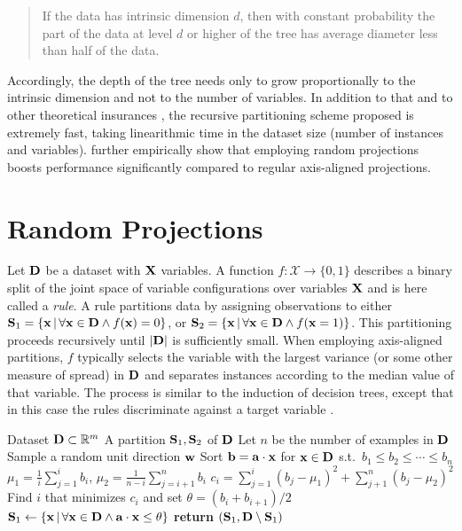\begin{quote}
  If the data has intrinsic dimension $d$, then with constant probability the part of the data at
  level $d$ or higher of the tree has average diameter less than half of the data.
\end{quote}

Accordingly, the depth of the tree needs only to grow proportionally to the intrinsic dimension and
not to the number of variables. In addition to that and to other theoretical insurances
\citep{dhesi10}, the recursive partitioning scheme proposed is extremely fast, taking linearithmic
time in the dataset size (number of instances and variables). \citet{dasgupta08a} further
empirically show that employing random projections boosts performance significantly compared to
regular axis-aligned projections.

\section{Random Projections}
\label{sec:rp}

Let $\mathbf{D}$ be a dataset with $\mathbf{X}$ variables. A function $f:\mathcal{X}\to\{0,1\}$ describes
a binary split of the joint space of variable configurations over variables $\mathbf{X}$ and is here
called a \emph{rule}. A rule partitions data by assigning observations to either
$\mathbf{S}_1=\{\mathbf{x}\,|\,\forall\mathbf{x}\in\mathbf{D}\wedge f(\mathbf{x})=0\}$, or
$\mathbf{S}_2=\{\mathbf{x}\,|\,\forall\mathbf{x}\in\mathbf{D}\wedge f(\mathbf{x}=1)\}$. This partitioning proceeds
recursively until $|\mathbf{D}|$ is sufficiently small. When employing axis-aligned partitions, $f$
typically selects the variable with the largest variance (or some other measure of spread) in
$\mathbf{D}$ and separates instances according to the median value of that variable. The process is
similar to the induction of decision trees, except that in this case the rules discriminate against
a target variable \citep{breiman01}.

\begin{algorithm}[t]
  \caption{}\label{alg:splitsid}
  \begin{algorithmic}[1]
    \Require Dataset $\mathbf{D}\subset\mathbb{R}^m$
    \Ensure A partition $\mathbf{S}_1,\mathbf{S}_2$ of $\mathbf{D}$
    \State Let $n$ be the number of examples in $\mathbf{D}$
    \State Sample a random unit direction $\mathbf{w}$
    \State Sort $\mathbf{b}=\mathbf{a}\cdot\mathbf{x}$ for $\mathbf{x}\in\mathbf{D}$ s.t.\ $b_1\leq b_2\leq\dotsb\leq b_n$
      \State $\mu_1 = \frac{1}{i}\sum_{j=1}^i b_i$, \; $\mu_2 = \frac{1}{n-i}\sum_{j=i+1}^n b_i$
      \State $c_i = \sum_{j=1}^i (b_j - \mu_1)^2 + \sum_{j+1}^n (b_j - \mu_2)^2$
    \EndFor
    \State Find $i$ that minimizes $c_i$ and set $\theta = (b_i + b_{i+1})/2$
    \State $\mathbf{S}_1 \gets \{\mathbf{x}\,|\,\forall\mathbf{x}\in\mathbf{D}\wedge\mathbf{a}\cdot\mathbf{x}\leq\theta\}$
    \State \textbf{return} $(\mathbf{S}_1,\mathbf{D} \setminus \mathbf{S}_1)$
  \end{algorithmic}
\end{algorithm}

